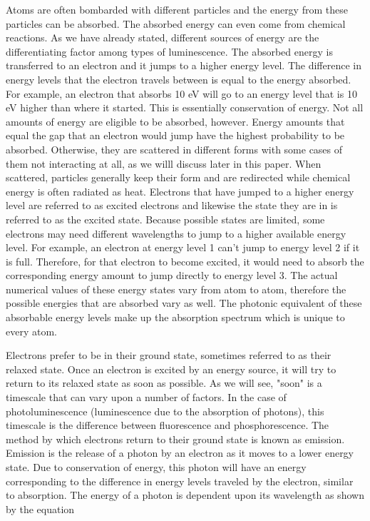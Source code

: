 \documentclass[prl,onecolumn]{revtex4-1}  %
\begin{document}
\par %
Atoms are often bombarded with different particles and the energy from these particles can be absorbed. The absorbed energy can even come from chemical reactions. As we have already stated, different sources of energy are the differentiating factor among types of luminescence. The absorbed energy is transferred to an electron and it jumps to a higher energy level. The difference in energy levels that the electron travels between is equal to the energy absorbed. For example, an electron that absorbs 10 eV will go to an energy level that is 10 eV higher than where it started. This is essentially conservation of energy. Not all amounts of energy are eligible to be absorbed, however. Energy amounts that equal the gap that an electron would jump have the highest probability to be absorbed. Otherwise, they are scattered in different forms with some cases of them not interacting at all, as we willl discuss later in this paper. When scattered, particles generally keep their form and are redirected while chemical energy is often radiated as heat. Electrons that have jumped to a higher energy level are referred to as excited electrons and likewise the state they are in is referred to as the excited state. Because possible states are limited, some electrons may need different wavelengths to jump to a higher available energy level. For example, an electron at energy level 1 can't jump to energy level 2 if it is full. Therefore, for that electron to become excited, it would need to absorb the corresponding energy amount to jump directly to energy level 3. The actual numerical values of these energy states vary from atom to atom, therefore the possible energies that are absorbed vary as well. The photonic equivalent of these absorbable energy levels make up the absorption spectrum which is unique to every atom.


\par
Electrons prefer to be in their ground state, sometimes referred to as their relaxed state. Once an electron is excited by an energy source, it will try to return to its relaxed state as soon as possible. As we will see, "soon" is a timescale that can vary upon a number of factors. In the case of photoluminescence (luminescence due to the absorption of photons), this timescale is the difference between fluorescence and phosphorescence. The method by which electrons return to their ground state is known as emission. Emission is the release of a photon by an electron as it moves to a lower energy state. Due to conservation of energy, this photon will have an energy corresponding to the difference in energy levels traveled by the electron, similar to absorption. The energy of a photon is dependent upon its wavelength as shown by the equation
\end{document}

